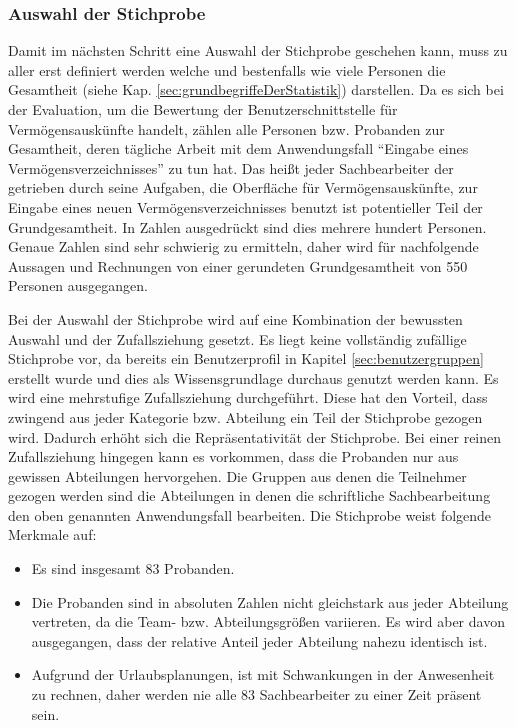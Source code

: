 
\subsubsection{Auswahl der Stichprobe}
Damit im nächsten Schritt eine Auswahl der Stichprobe geschehen kann, muss zu aller erst definiert werden welche und bestenfalls wie viele Personen die Gesamtheit (siehe Kap. \ref{sec:grundbegriffeDerStatistik}) darstellen. Da es sich bei der Evaluation, um die Bewertung der Benutzerschnittstelle für Vermögensauskünfte handelt, zählen alle Personen bzw. Probanden zur Gesamtheit, deren tägliche Arbeit mit dem Anwendungsfall \enquote{Eingabe eines Vermögensverzeichnisses} zu tun hat. Das heißt jeder Sachbearbeiter der getrieben durch seine Aufgaben, die Oberfläche für Vermögensauskünfte, zur Eingabe eines neuen Vermögensverzeichnisses benutzt ist potentieller Teil der Grundgesamtheit. In Zahlen ausgedrückt sind dies mehrere hundert Personen. Genaue Zahlen sind sehr schwierig zu ermitteln, daher wird für nachfolgende Aussagen und Rechnungen von einer gerundeten Grundgesamtheit von 550 Personen ausgegangen.

Bei der Auswahl der Stichprobe wird auf eine Kombination der bewussten Auswahl und der Zufallsziehung gesetzt. Es liegt keine vollständig zufällige Stichprobe vor, da bereits ein Benutzerprofil in Kapitel \ref{sec:benutzergruppen} erstellt wurde und dies als Wissensgrundlage durchaus genutzt werden kann. Es wird eine mehrstufige Zufallsziehung durchgeführt. Diese hat den Vorteil, dass zwingend aus jeder Kategorie bzw. Abteilung ein Teil der Stichprobe gezogen wird. Dadurch erhöht sich die Repräsentativität der Stichprobe. Bei einer reinen Zufallsziehung hingegen kann es vorkommen, dass die Probanden nur aus gewissen Abteilungen hervorgehen. Die Gruppen aus denen die Teilnehmer gezogen werden sind die Abteilungen in denen die schriftliche Sachbearbeitung den oben genannten Anwendungsfall bearbeiten. Die Stichprobe weist folgende Merkmale auf:
\begin{itemize}
    \item Es sind insgesamt 83 Probanden.
    \item Die Probanden sind in absoluten Zahlen nicht gleichstark aus jeder Abteilung vertreten, da die Team- bzw. Abteilungsgrößen variieren. Es wird aber davon ausgegangen, dass der relative Anteil jeder Abteilung nahezu identisch ist.
    \item Aufgrund der Urlaubsplanungen, ist mit Schwankungen in der Anwesenheit zu rechnen, daher werden nie alle 83 Sachbearbeiter zu einer Zeit präsent sein.
\end{itemize}

